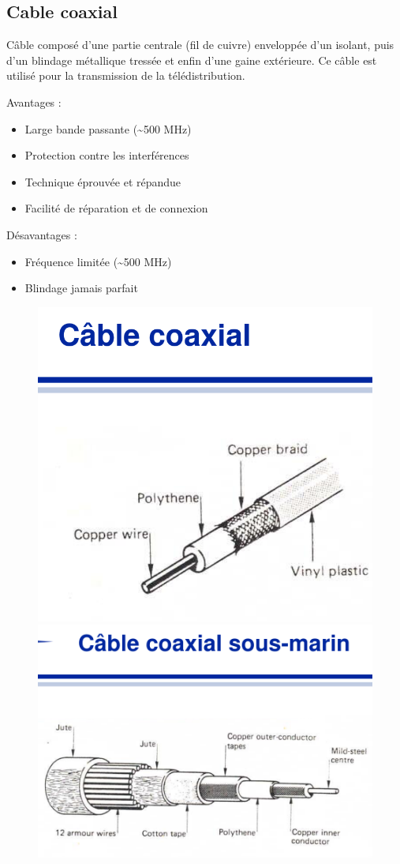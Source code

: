 	\subsection{Cable coaxial}
		Câble composé d'une partie centrale (fil de cuivre) enveloppée d'un isolant, puis d'un blindage métallique tressée et enfin d'une gaine extérieure. Ce câble est utilisé pour la transmission de la télédistribution.
		
		Avantages :
		\begin{itemize}
			\item Large bande passante (\sim 500 MHz)
			\item Protection contre les interférences
			\item Technique éprouvée et répandue
			\item Facilité de réparation et de connexion
		\end{itemize}
		
		Désavantages :
		\begin{itemize}
			\item Fréquence limitée (\sim 500 MHz)
			\item Blindage jamais parfait
		\end{itemize}
		
		\begin{figure}[H]
\centering
\begin{minipage}{.5\textwidth}
  \centering
  \includegraphics[width=.6\textwidth]{img/coaxial1.png}
\end{minipage}%
\begin{minipage}{.5\textwidth}
  \centering
  \includegraphics[width=.6\textwidth]{img/coaxial2.png}
\end{minipage}
\begin{minipage}{.5\textwidth}
  \centering
\end{minipage}

\end{figure}		

